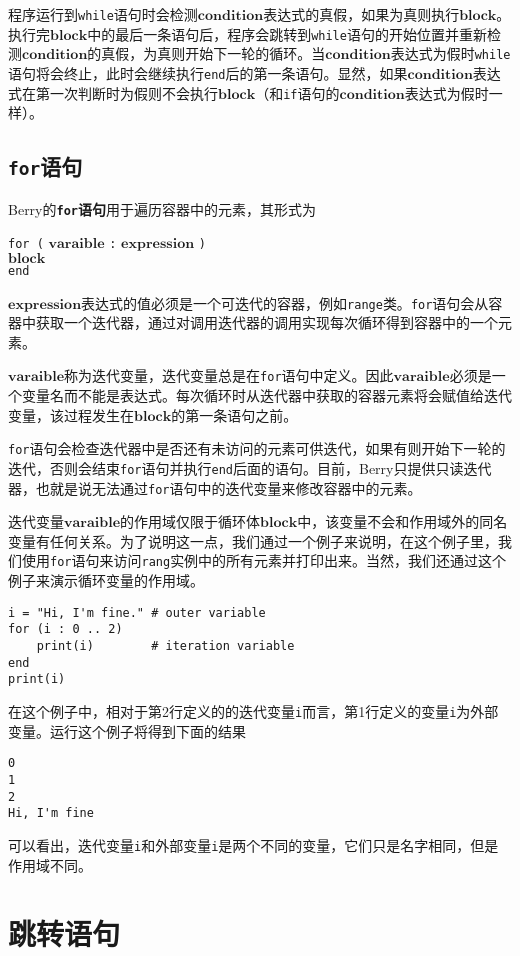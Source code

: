 程序运行到\texttt{while}语句时会检测$\bm{condition}$表达式的真假，如果为真则执行$\bm{block}$。执行完$\bm{block}$中的最后一条语句后，程序会跳转到\texttt{while}语句的开始位置并重新检测$\bm{condition}$的真假，为真则开始下一轮的循环。当$\bm{condition}$表达式为假时\texttt{while}语句将会终止，此时会继续执行\texttt{end}后的第一条语句。显然，如果$\bm{condition}$表达式在第一次判断时为假则不会执行$\bm{block}$（和\texttt{if}语句的$\bm{condition}$表达式为假时一样）。

\subsection{\texttt{for}语句}

Berry的\textbf{\texttt{for}语句}用于遍历容器中的元素，其形式为
\begin{algorithm}
    \texttt{for (} $\bm{varaible}$ \texttt{:} $\bm{expression}$ \texttt{)} \\
        \qquad $\bm{block}$ \\
    \texttt{end}
\end{algorithm}

$\bm{expression}$表达式的值必须是一个可迭代的容器，例如\texttt{range}类。\texttt{for}语句会从容器中获取一个迭代器，通过对调用迭代器的调用实现每次循环得到容器中的一个元素。

$\bm{varaible}$称为迭代变量，迭代变量总是在\texttt{for}语句中定义。因此$\bm{varaible}$必须是一个变量名而不能是表达式。每次循环时从迭代器中获取的容器元素将会赋值给迭代变量，该过程发生在$\bm{block}$的第一条语句之前。

\texttt{for}语句会检查迭代器中是否还有未访问的元素可供迭代，如果有则开始下一轮的迭代，否则会结束\texttt{for}语句并执行\texttt{end}后面的语句。目前，Berry只提供只读迭代器，也就是说无法通过\texttt{for}语句中的迭代变量来修改容器中的元素。

迭代变量$\bm{varaible}$的作用域仅限于循环体$\bm{block}$中，该变量不会和作用域外的同名变量有任何关系。为了说明这一点，我们通过一个例子来说明，在这个例子里，我们使用\texttt{for}语句来访问\texttt{rang}实例中的所有元素并打印出来。当然，我们还通过这个例子来演示循环变量的作用域。
\begin{lstlisting}[language=berry]
i = "Hi, I'm fine." # outer variable
for (i : 0 .. 2)
    print(i)        # iteration variable
end
print(i)
\end{lstlisting}

在这个例子中，相对于第2行定义的的迭代变量\texttt{i}而言，第1行定义的变量\texttt{i}为外部变量。运行这个例子将得到下面的结果
\begin{lstlisting}[numbers=none]
0
1
2
Hi, I'm fine
\end{lstlisting}
可以看出，迭代变量\texttt{i}和外部变量\texttt{i}是两个不同的变量，它们只是名字相同，但是作用域不同。

\section{跳转语句}
